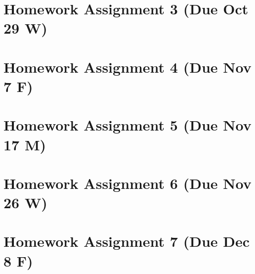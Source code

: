 \documentclass{amsart}
\theoremstyle{plain}
\theoremstyle{definition}
\begin{document}
	
	\section{Homework Assignment 3 (Due Oct 29 W)}
	\section{Homework Assignment 4 (Due Nov 7 F)}
	\section{Homework Assignment 5 (Due Nov 17 M)}
	\section{Homework Assignment 6 (Due Nov 26 W)}
	\section{Homework Assignment 7 (Due Dec 8 F)}


	
	
	
	
	
	
	
	
\end{document}
